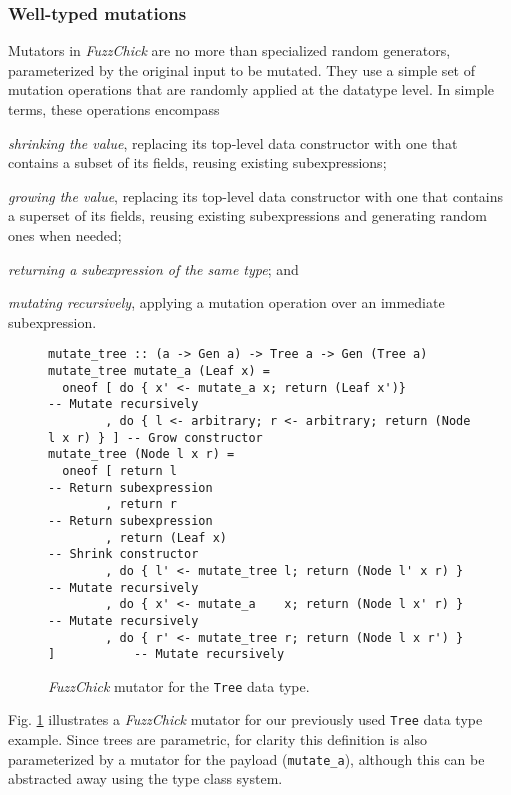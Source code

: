 \documentclass[acmsmall, anonymous]{acmart}
\newcommand{\fuzzchick}{\textit{FuzzChick}\xspace}
\begin{document}
\subsubsection{Well-typed mutations}

Mutators in \fuzzchick are no more than specialized random generators,
parameterized by the original input to be mutated.
%
They use a simple set of mutation operations that are randomly applied at the
datatype level.
%
In simple terms, these operations encompass
%
\begin{inparaenum}
\item \emph{shrinking the value}, replacing its top-level data constructor with
  one that contains a subset of its fields, reusing existing subexpressions;
\item \emph{growing the value}, replacing its top-level data constructor with
  one that contains a superset of its fields, reusing existing subexpressions
  and generating random ones when needed;
\item \emph{returning a subexpression of the same type}; and
\item \emph{mutating recursively}, applying a mutation operation over an
  immediate subexpression.
\end{inparaenum}


\begin{figure}
\begin{verbatim}
mutate_tree :: (a -> Gen a) -> Tree a -> Gen (Tree a)
mutate_tree mutate_a (Leaf x) =
  oneof [ do { x' <- mutate_a x; return (Leaf x')}                     -- Mutate recursively
        , do { l <- arbitrary; r <- arbitrary; return (Node l x r) } ] -- Grow constructor
mutate_tree (Node l x r) =
  oneof [ return l                                                     -- Return subexpression
        , return r                                                     -- Return subexpression
        , return (Leaf x)                                              -- Shrink constructor
        , do { l' <- mutate_tree l; return (Node l' x r) }             -- Mutate recursively
        , do { x' <- mutate_a    x; return (Node l x' r) }             -- Mutate recursively
        , do { r' <- mutate_tree r; return (Node l x r') } ]           -- Mutate recursively
\end{verbatim}
\caption{\label{fig:fuzzchick:mutator}\fuzzchick mutator for the \texttt{Tree} data type. }
\end{figure}

Fig. \ref{fig:fuzzchick:mutator} illustrates a \fuzzchick mutator for our
previously used \texttt{Tree} data type example.
%
Since trees are parametric, for clarity this definition is also parameterized by
a mutator for the payload (\texttt{mutate\_a}), although this can be abstracted
away using the type class system.
\end{document}
